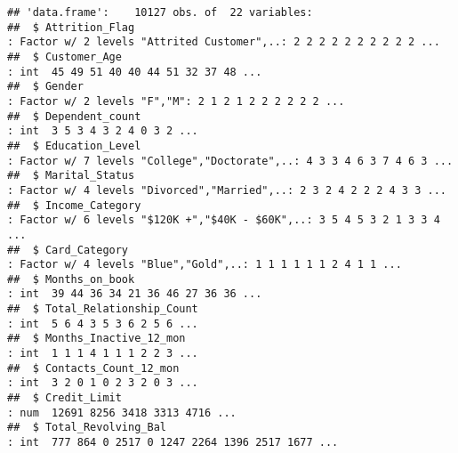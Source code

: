 \documentclass[
]{article}
\begin{document}
\begin{verbatim}
## 'data.frame':    10127 obs. of  22 variables:
##  $ Attrition_Flag                                                                                                                    : Factor w/ 2 levels "Attrited Customer",..: 2 2 2 2 2 2 2 2 2 2 ...
##  $ Customer_Age                                                                                                                      : int  45 49 51 40 40 44 51 32 37 48 ...
##  $ Gender                                                                                                                            : Factor w/ 2 levels "F","M": 2 1 2 1 2 2 2 2 2 2 ...
##  $ Dependent_count                                                                                                                   : int  3 5 3 4 3 2 4 0 3 2 ...
##  $ Education_Level                                                                                                                   : Factor w/ 7 levels "College","Doctorate",..: 4 3 3 4 6 3 7 4 6 3 ...
##  $ Marital_Status                                                                                                                    : Factor w/ 4 levels "Divorced","Married",..: 2 3 2 4 2 2 2 4 3 3 ...
##  $ Income_Category                                                                                                                   : Factor w/ 6 levels "$120K +","$40K - $60K",..: 3 5 4 5 3 2 1 3 3 4 ...
##  $ Card_Category                                                                                                                     : Factor w/ 4 levels "Blue","Gold",..: 1 1 1 1 1 1 2 4 1 1 ...
##  $ Months_on_book                                                                                                                    : int  39 44 36 34 21 36 46 27 36 36 ...
##  $ Total_Relationship_Count                                                                                                          : int  5 6 4 3 5 3 6 2 5 6 ...
##  $ Months_Inactive_12_mon                                                                                                            : int  1 1 1 4 1 1 1 2 2 3 ...
##  $ Contacts_Count_12_mon                                                                                                             : int  3 2 0 1 0 2 3 2 0 3 ...
##  $ Credit_Limit                                                                                                                      : num  12691 8256 3418 3313 4716 ...
##  $ Total_Revolving_Bal                                                                                                               : int  777 864 0 2517 0 1247 2264 1396 2517 1677 ...

\end{verbatim}
\end{document}
